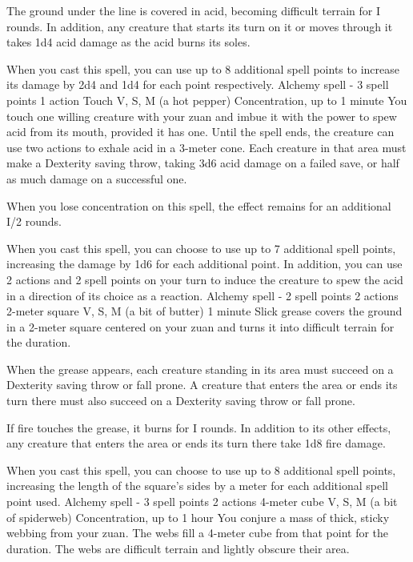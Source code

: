         The ground under the line is covered in acid, becoming difficult terrain for I rounds.
        In addition, any creature that starts its turn on it or moves through it takes 1d4 acid damage as the acid burns its soles.

        When you cast this spell, you can use up to 8 additional spell points to increase its damage by 2d4 and 1d4 for each point respectively.
        {Alchemy spell - 3 spell points}
        {1 action}
        {Touch}
        {V, S, M (a hot pepper)}
        {Concentration, up to 1 minute}
        You touch one willing creature with your zuan and imbue it with the power to spew acid from its mouth, provided it has one.
        Until the spell ends, the creature can use two actions to exhale acid in a 3-meter cone.
        Each creature in that area must make a Dexterity saving throw, taking 3d6 acid damage on a failed save, or half as much damage on a successful one.

        When you lose concentration on this spell, the effect remains for an additional I/2 rounds.

        When you cast this spell, you can choose to use up to 7 additional spell points, increasing the damage by 1d6 for each additional point.
        In addition, you can use 2 actions and 2 spell points on your turn to induce the creature to spew the acid in a direction of its choice as a reaction.
        {Alchemy spell - 2 spell points}
        {2 actions}
        {2-meter square}
        {V, S, M (a bit of butter)}
        {1 minute}
        Slick grease covers the ground in a 2-meter square centered on your zuan and turns it into difficult terrain for the duration.

        When the grease appears, each creature standing in its area must succeed on a Dexterity saving throw or fall prone.
        A creature that enters the area or ends its turn there must also succeed on a Dexterity saving throw or fall prone.

        If fire touches the grease, it burns for I rounds.
        In addition to its other effects, any creature that enters the area or ends its turn there take 1d8 fire damage.

        When you cast this spell, you can choose to use up to 8 additional spell points, increasing the length of the square's sides by a meter for each additional spell point used.
        {Alchemy spell - 3 spell points}
        {2 actions}
        {4-meter cube}
        {V, S, M (a bit of spiderweb)}
        {Concentration, up to 1 hour}
        You conjure a mass of thick, sticky webbing from your zuan.
        The webs fill a 4-meter cube from that point for the duration.
        The webs are difficult terrain and lightly obscure their area.

